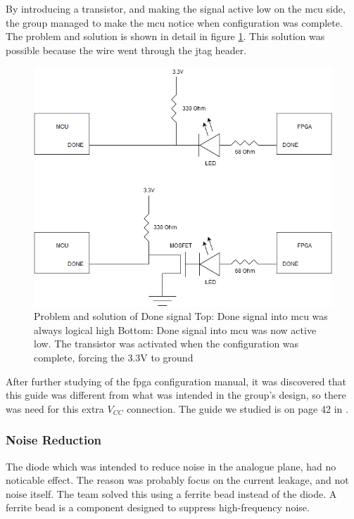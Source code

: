 By introducing a transistor, and making the signal active low on the \gls{mcu} side, the group managed to make the \gls{mcu} notice when configuration was complete.
The problem and solution is shown in detail in figure \ref{fig:Done Issue}.
This solution was possible because the wire went through the \gls{jtag} header.

\begin{figure}[h!]
\centering
\includegraphics[scale=0.5]{images/Done_Signal_Issue.png}
\caption{Problem and solution of Done signal
         \newline
         Top: Done signal into \gls{mcu} was always logical high
         \newline
         Bottom: Done signal into \gls{mcu} was now active low. The transistor was activated when the configuration was complete, forcing the 3.3V to ground}
\label{fig:Done Issue}
\end{figure}

After further studying of the \gls{fpga} configuration manual, it was discovered that this guide was different from what was intended in the group's design, so there was need for this extra \(V_{CC}\) connection. The guide we studied is on page 42 in \cite{fpga-configuration}.

\subsubsection{Noise Reduction}
The diode which was intended to reduce noise in the analogue plane, had no noticable effect. 
The reason was probably focus on the current leakage, and not noise itself. 
The team solved this using a ferrite bead instead of the diode. 
A ferrite bead is a component designed to suppress high-frequency noise. 

